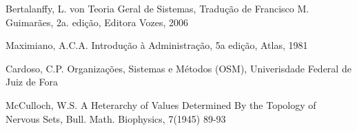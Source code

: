 \documentclass[
12pt,		%
openright,	%
twoside,  %
a4paper,			%
chapter=TITLE,		%
english,			%
french,				%
spanish,			%
brazil				%
]{USPSC-classe/USPSC}
\begin{document}
\begin{flushleft}
\begin{flushleft}
\begin{flushleft}
\begin{flushleft}
[BERTALANFFY, 1968] Bertalanffy, L. von Teoria Geral de Sistemas, Tradu\c{c}\~ao de Francisco M. Guimar\~aes, 2a. edi\c{c}\~ao, Editora Vozes, 2006
\end{flushleft}


\end{flushleft}


\end{flushleft}


\end{flushleft}


\begin{flushleft}
\begin{flushleft}
\begin{flushleft}
\begin{flushleft}
[MAXIMIANO, 1981] Maximiano, A.C.A. Introdu\c{c}\~ao \`a Administra\c{c}\~ao, 5a edi\c{c}\~ao, Atlas, 1981
\end{flushleft}


\end{flushleft}


\end{flushleft}


\end{flushleft}


\begin{flushleft}
\begin{flushleft}
\begin{flushleft}
\begin{flushleft}
[CARDOSO, 2014] Cardoso, C.P. Organiza\c{c}\~oes, Sistemas e M\'etodos (OSM), Univerisdade Federal de Juiz de Fora
\end{flushleft}


\end{flushleft}


\end{flushleft}


\end{flushleft}


\begin{flushleft}
\begin{flushleft}
\begin{flushleft}
\begin{flushleft}
[McCULLOCH, 1945] McCulloch, W.S. A Heterarchy of Values Determined By the Topology of Nervous Sets, Bull. Math. Biophysics, 7(1945) 89-93
\end{flushleft}


\end{flushleft}


\end{flushleft}


\end{flushleft}
\end{document}
